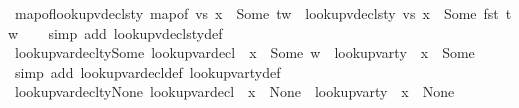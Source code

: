 \begin{isabellebody}
\endisatagproof
{\isafoldproof}%
%
\isadelimproof
\isanewline
%
\endisadelimproof
\isanewline
{}\isamarkupfalse%
\ map{\isacharunderscore}{\kern0pt}of{\isacharunderscore}{\kern0pt}lookup{\isacharunderscore}{\kern0pt}vdecls{\isacharunderscore}{\kern0pt}ty{\isacharcolon}{\kern0pt}\ {\isachardoublequoteopen}map{\isacharunderscore}{\kern0pt}of\ vs\ x\ {\isacharequal}{\kern0pt}\ Some\ tw\ {\isasymLongrightarrow}\ lookup{\isacharunderscore}{\kern0pt}vdecls{\isacharunderscore}{\kern0pt}ty\ vs\ x\ {\isacharequal}{\kern0pt}\ Some\ {\isacharparenleft}{\kern0pt}fst\ tw{\isacharparenright}{\kern0pt}{\isachardoublequoteclose}\isanewline
%
\isadelimproof
\ \ %
\endisadelimproof
%
\isatagproof
{}\isamarkupfalse%
\ {\isacharparenleft}{\kern0pt}simp\ add{\isacharcolon}{\kern0pt}\ lookup{\isacharunderscore}{\kern0pt}vdecls{\isacharunderscore}{\kern0pt}ty{\isacharunderscore}{\kern0pt}def{\isacharparenright}{\kern0pt}%
\endisatagproof
{\isafoldproof}%
%
\isadelimproof
\isanewline
%
\endisadelimproof
\isanewline
{}\isamarkupfalse%
\ lookup{\isacharunderscore}{\kern0pt}var{\isacharunderscore}{\kern0pt}decl{\isacharunderscore}{\kern0pt}ty{\isacharunderscore}{\kern0pt}Some{\isacharcolon}{\kern0pt}\ {\isachardoublequoteopen}lookup{\isacharunderscore}{\kern0pt}var{\isacharunderscore}{\kern0pt}decl\ {\isasymLambda}\ x\ {\isacharequal}{\kern0pt}\ Some\ {\isacharparenleft}{\kern0pt}{\isasymtau}{\isacharcomma}{\kern0pt}w{\isacharparenright}{\kern0pt}\ {\isasymLongrightarrow}\ lookup{\isacharunderscore}{\kern0pt}var{\isacharunderscore}{\kern0pt}ty\ {\isasymLambda}\ x\ {\isacharequal}{\kern0pt}\ Some\ {\isasymtau}{\isachardoublequoteclose}\isanewline
%
\isadelimproof
\ \ %
\endisadelimproof
%
\isatagproof
{}\isamarkupfalse%
\ {\isacharparenleft}{\kern0pt}simp\ add{\isacharcolon}{\kern0pt}\ lookup{\isacharunderscore}{\kern0pt}var{\isacharunderscore}{\kern0pt}decl{\isacharunderscore}{\kern0pt}def\ lookup{\isacharunderscore}{\kern0pt}var{\isacharunderscore}{\kern0pt}ty{\isacharunderscore}{\kern0pt}def{\isacharparenright}{\kern0pt}%
\endisatagproof
{\isafoldproof}%
%
\isadelimproof
\isanewline
%
\endisadelimproof
\isanewline
{}\isamarkupfalse%
\ lookup{\isacharunderscore}{\kern0pt}var{\isacharunderscore}{\kern0pt}decl{\isacharunderscore}{\kern0pt}ty{\isacharunderscore}{\kern0pt}None{\isacharcolon}{\kern0pt}\ {\isachardoublequoteopen}lookup{\isacharunderscore}{\kern0pt}var{\isacharunderscore}{\kern0pt}decl\ {\isasymLambda}\ x\ {\isacharequal}{\kern0pt}\ None\ {\isasymLongrightarrow}\ lookup{\isacharunderscore}{\kern0pt}var{\isacharunderscore}{\kern0pt}ty\ {\isasymLambda}\ x\ {\isacharequal}{\kern0pt}\ None{\isachardoublequoteclose}\isanewline

\end{isabellebody}
